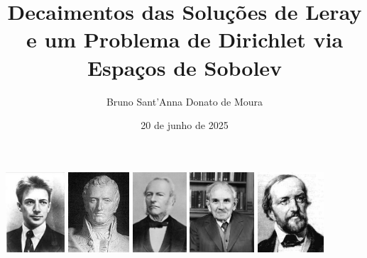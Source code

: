 \documentclass[xcolor=dvipsnames, aspectratio=169, 10pt]{beamer}
\title{Decaimentos das Soluções de Leray e um Problema de
Dirichlet via Espaços de Sobolev}
\author{Bruno Sant'Anna Donato de Moura}
\date{20 de junho de 2025}
\institute{Universidade Federal de Sergipe\\Departamento de Matemática}
\begin{document}
\maketitle

\begin{frame}
    \begin{center}
        \includegraphics[height=3cm]{../sobolev.jpg} \hspace{5mm} \pause \includegraphics[height=3cm]{../Claude-Louis_Navier.jpg} \hspace{5mm} \includegraphics[height=3cm]{../SS-stokes.jpg} \hspace{5mm} \pause
        \includegraphics[height=3cm]{../leray.jpg} \hspace{5mm} \pause
        \includegraphics[height=3cm]{../Dirichlet.jpg} 
    \end{center}
\end{frame}
\end{document}

